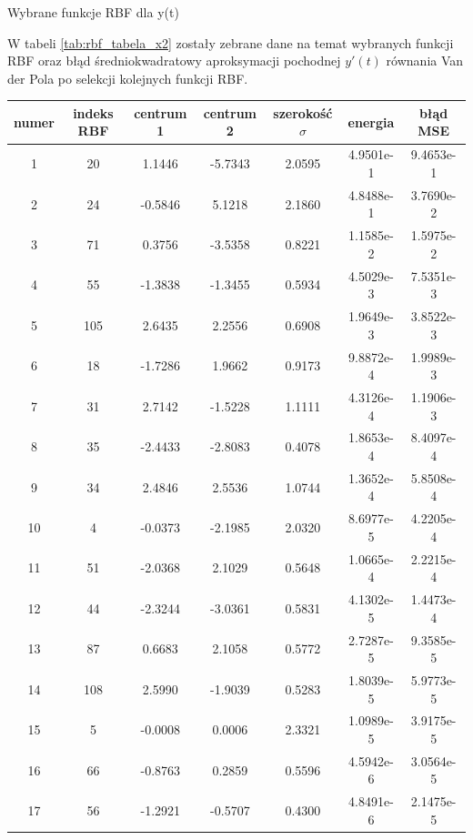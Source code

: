 \begin{table}[ht!]
\caption{Wybrane funkcje RBF dla y(t)}
\label{tab:rbf_tabela_x1}
\end{table}

W tabeli \ref{tab:rbf_tabela_x2} zostały zebrane dane na temat wybranych funkcji RBF oraz błąd średniokwadratowy aproksymacji pochodnej $y'(t)$ równania Van der Pola po selekcji kolejnych funkcji RBF.

\begin{table}[ht!]
\centering

\begin{tabular}{ |c| c| c| c| c| c| c| }
\hline
numer & indeks RBF & centrum 1 & centrum 2 & szerokość $\sigma$ & energia      & błąd MSE    \\ \hline    
    1 &  20 &   1.1446 &  -5.7343  &  2.0595 &   4.9501e-1 & 9.4653e-1 \\
    2 &  24 &  -0.5846 &   5.1218  &  2.1860 &   4.8488e-1 & 3.7690e-2 \\
    3 &  71 &   0.3756 &  -3.5358  &  0.8221 &   1.1585e-2 & 1.5975e-2 \\
    4 &  55 &  -1.3838 &  -1.3455  &  0.5934 &   4.5029e-3 & 7.5351e-3 \\
    5 & 105 &   2.6435 &   2.2556  &  0.6908 &   1.9649e-3 & 3.8522e-3 \\
    6 &  18 &  -1.7286 &   1.9662  &  0.9173 &   9.8872e-4 & 1.9989e-3 \\
    7 &  31 &   2.7142 &  -1.5228  &  1.1111 &   4.3126e-4 & 1.1906e-3 \\
    8 &  35 &  -2.4433 &  -2.8083  &  0.4078 &   1.8653e-4 & 8.4097e-4 \\
    9 &  34 &   2.4846 &   2.5536  &  1.0744 &   1.3652e-4 & 5.8508e-4 \\
   10 &   4 &  -0.0373 &  -2.1985  &  2.0320 &   8.6977e-5 & 4.2205e-4 \\
   11 &  51 &  -2.0368 &   2.1029  &  0.5648 &   1.0665e-4 & 2.2215e-4 \\
   12 &  44 &  -2.3244 &  -3.0361  &  0.5831 &   4.1302e-5 & 1.4473e-4 \\
   13 &  87 &   0.6683 &   2.1058  &  0.5772 &   2.7287e-5 & 9.3585e-5 \\
   14 & 108 &   2.5990 &  -1.9039  &  0.5283 &   1.8039e-5 & 5.9773e-5 \\
   15 &   5 &  -0.0008 &   0.0006  &  2.3321 &   1.0989e-5 & 3.9175e-5 \\
   16 &  66 &  -0.8763 &   0.2859  &  0.5596 &   4.5942e-6 & 3.0564e-5 \\
   17 &  56 &  -1.2921 &  -0.5707  &  0.4300 &   4.8491e-6 & 2.1475e-5 \\

\end{tabular}
\end{table}

